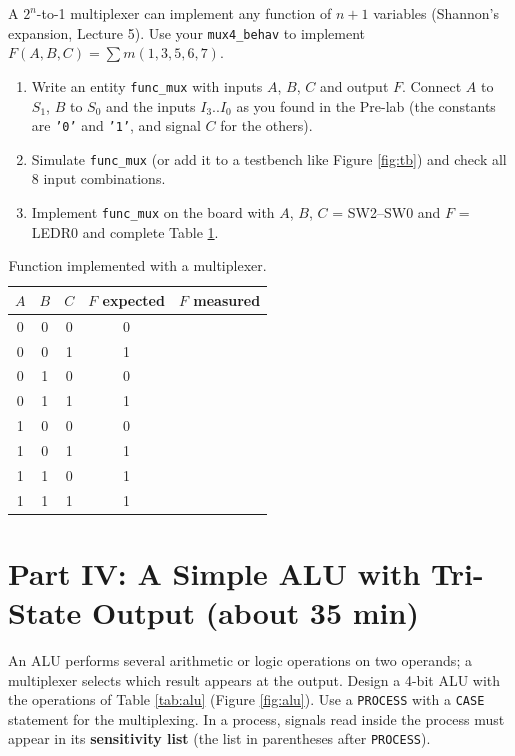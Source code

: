 \documentclass{article}
\begin{document}
A $2^n$-to-1 multiplexer can implement any function of $n+1$ variables (Shannon's expansion, Lecture 5). Use your \texttt{mux4\_behav} to implement $F(A,B,C) = \sum m(1,3,5,6,7)$.

\begin{enumerate}
    \item Write an entity \texttt{func\_mux} with inputs $A$, $B$, $C$ and output $F$. Connect $A$ to $S_1$, $B$ to $S_0$ and the inputs $I_3..I_0$ as you found in the Pre-lab (the constants are \texttt{'0'} and \texttt{'1'}, and signal $C$ for the others).
    \item Simulate \texttt{func\_mux} (or add it to a testbench like Figure \ref{fig:tb}) and check all 8 input combinations.
    \item Implement \texttt{func\_mux} on the board with $A$, $B$, $C$ = SW2--SW0 and $F$ = LEDR0 and complete Table \ref{tab:func}.
\end{enumerate}

\begin{table}[H]
    \centering
    \begin{tabular}{|c|c|c|c|c|}
        \hline
        $A$ & $B$ & $C$ & $F$ expected & $F$ measured \\
        \hline
        0&0&0&0& \\ \hline
        0&0&1&1& \\ \hline
        0&1&0&0& \\ \hline
        0&1&1&1& \\ \hline
        1&0&0&0& \\ \hline
        1&0&1&1& \\ \hline
        1&1&0&1& \\ \hline
        1&1&1&1& \\ \hline
    \end{tabular}
    \caption{Function implemented with a multiplexer.}
    \label{tab:func}
\end{table}

\section*{Part IV: A Simple ALU with Tri-State Output (about 35 min)}

An ALU performs several arithmetic or logic operations on two operands; a multiplexer selects which result appears at the output. Design a 4-bit ALU with the operations of Table \ref{tab:alu} (Figure \ref{fig:alu}). Use a \texttt{PROCESS} with a \texttt{CASE} statement for the multiplexing. In a process, signals read inside the process must appear in its \textbf{sensitivity list} (the list in parentheses after \texttt{PROCESS}).
\end{document}

